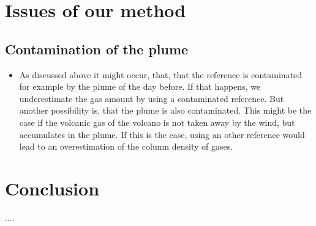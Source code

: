 \documentclass  [
  paper    = a4,
  BCOR     = 10mm,
  twoside,
  fontsize = 12pt,
  fleqn,
  toc      = bibnumbered,
  toc      = listofnumbered,
  numbers  = noendperiod,
  headings = normal,
  listof   = leveldown,
  version  = 3.03
]                                       {scrreprt}
\begin{document}
	\chapter{Issues of our method}
	
	\section{Contamination of the plume}
	\begin{itemize}
		\item As discussed above it might occur, that, that the reference is contaminated for example by the plume of the day before. If that happens, we underestimate the gas amount by using a contaminated reference. But another possibility is, that the plume is also contaminated. This might be the case if the volcanic gas of the volcano is not taken away by the wind, but accumulates in the plume. If this is the case, using an other reference would lead to an overestimation of the column density of gases.
	\end{itemize}

	\chapter{Conclusion}
	....
	
	
	
\end{document}
